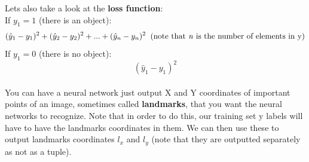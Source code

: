 \documentclass[11pt, a4paper]{article}
\begin{document}
\begin{spacing}{1.1}
	Lets also take a look at the \textbf{loss function}: \\
	If $y_1 = 1$ (there is an object): 
	$$ (\hat{y}_1 - y_1)^2 + (\hat{y}_2 - y_2)^2 + ... + (\hat{y}_n - y_n)^2 \;\; \text{(note that \textit{n} is the number of elements in y)}$$
	If $y_1 = 0$ (there is no object):
	$$ (\hat{y}_1 - y_1)^2 $$ \\
	You can have a neural network just output X and Y coordinates of important points of an image, sometimes called \textbf{landmarks}, that you want the neural networks to recognize. Note that in order to do this, our training set y labels will have to have the landmarks coordinates in them. We can then use these to output landmarks coordinates $l_x$ and $l_y$ (note that they are outputted separately as not as a tuple). \newpage


\end{spacing}
\end{document}
